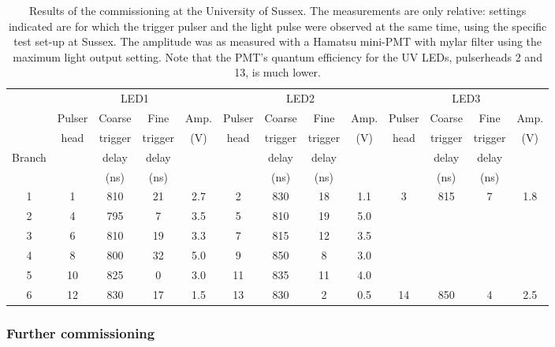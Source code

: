 \begin{table}[h!]
  \begin{center}
    \caption{Results of the commissioning at the University of Sussex. The measurements are only relative: settings indicated are for which the trigger pulser and the light pulse were observed at the same time, using the specific test set-up at Sussex. The amplitude was as measured with a Hamatsu mini-PMT with mylar filter using the maximum light output setting. Note that the PMT's quantum efficiency for the UV LEDs, pulserheads 2 and 13, is much lower.}
    \label{table:sussex_commissioning}
    \begin{tabular}{|c|c|c|c|c|c|c|c|c|c|c|c|c|} 
	\hline
	 & \multicolumn{4}{c|}{LED1} & \multicolumn{4}{c|}{LED2} & \multicolumn{4}{c|}{LED3} \\
	\cline{2-13}
		        & Pulser & Coarse   & Fine   & Amp.
		        & Pulser & Coarse   & Fine   & Amp.
		        & Pulser & Coarse   & Fine   & Amp. \\
	              & head    & trigger & trigger & (V) 
			 & head    & trigger & trigger & (V) 
                    & head    & trigger & trigger & (V) \\
	Branch    & & delay & delay & & & delay & delay & & & delay & delay & \\
	             & & (ns) & (ns) & & & (ns) & (ns) & & & (ns) & (ns) & \\
       \hline 
	1 & 1 & 810 & 21 & 2.7 & 2 & 830 & 18 & 1.1 & 3 & 815 & 7 & 1.8 \\
	2 & 4 & 795 & 7  & 3.5 & 5 & 810 & 19 & 5.0 & & & & \\
	3 & 6 & 810 & 19 & 3.3 & 7 & 815 & 12 & 3.5 & & & & \\
	4 & 8 & 800 & 32 & 5.0 & 9 & 850 & 8 & 3.0 & & & & \\
	5 & 10 & 825 & 0 & 3.0 & 11 & 835 & 11 & 4.0 & & & & \\
	6 & 12 & 830 & 17 & 1.5 & 13 & 830 & 2 & 0.5 & 14 & 850 & 4 & 2.5 \\
	\hline
    \end{tabular}
  \end{center}
\end{table}

\subsubsection*{Further commissioning}

